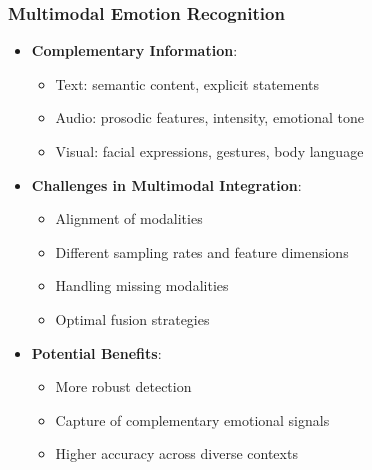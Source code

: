 \documentclass{beamer}
\begin{document}
\begin{frame}
\frametitle{Multimodal Emotion Recognition}
\begin{itemize}
    \item \textbf{Complementary Information}:
    \begin{itemize}
        \item Text: semantic content, explicit statements
        \item Audio: prosodic features, intensity, emotional tone
        \item Visual: facial expressions, gestures, body language
    \end{itemize}
    \item \textbf{Challenges in Multimodal Integration}:
    \begin{itemize}
        \item Alignment of modalities
        \item Different sampling rates and feature dimensions
        \item Handling missing modalities
        \item Optimal fusion strategies
    \end{itemize}
    \item \textbf{Potential Benefits}:
    \begin{itemize}
        \item More robust detection
        \item Capture of complementary emotional signals
        \item Higher accuracy across diverse contexts
    \end{itemize}
\end{itemize}
\end{frame}
\end{document}
